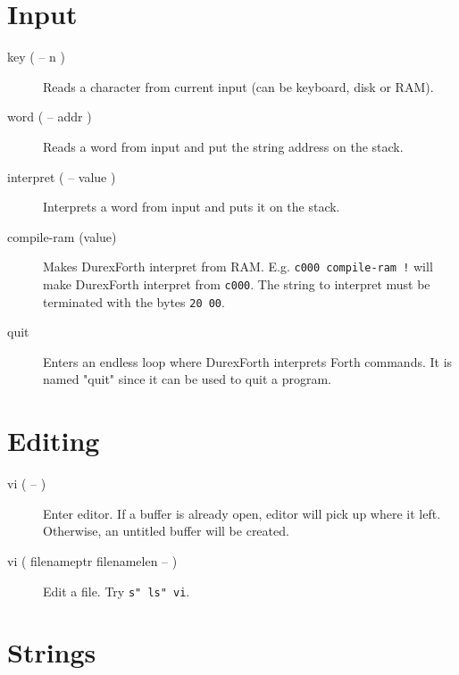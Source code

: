 \section{Input}

\begin{description}

\item[key ( -- n )] Reads a character from current input (can be keyboard, disk or RAM).

\item[word ( -- addr )] Reads a word from input and put the string address on the stack.

\item[interpret ( -- value )] Interprets a word from input and puts it on the stack.

\item[compile-ram (value)] Makes DurexForth interpret from RAM.
E.g. \texttt{c000 compile-ram !} will make DurexForth
interpret from \texttt{c000}. The string to interpret
must be terminated with the bytes \texttt{20 00}.

\item[quit] Enters an endless loop where DurexForth interprets Forth commands. It is named "quit" since it can be used to quit a program.

\end{description}

\section{Editing}

\begin{description}
\item[vi ( -- )]

Enter editor. If a buffer is already open, editor will pick up where it left.
Otherwise, an untitled buffer will be created.

\end{description}

\begin{description}
\item[vi ( filenameptr filenamelen -- )]

Edit a file. Try \texttt{s" ls" vi}.

\end{description}

\section{Strings}

